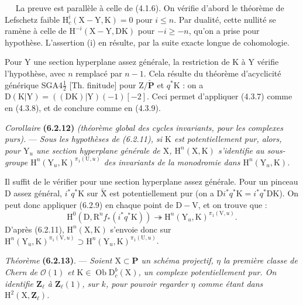 \documentclass[11pt,leqno]{article}
\newcommand{\Page}[1]{\ifvmode\noindent\else\unskip\ \fi{\footnotesize\textcolor{gray}{[p.\,#1]}}\ \ignorespaces}
\begin{document}
\Page{250}
La preuve est parallèle à celle de (4.1.6). On vérifie d’abord le théorème de Lefschetz faible \(\mathrm{H}_c^i(\mathrm{X}-\mathrm{Y},\mathrm{K})=0\) pour \(i\leq n\). Par dualité, cette nullité se ramène à celle de \(\mathrm{H}^{-i}(\mathrm{X}-\mathrm{Y},\mathrm{DK})\) pour \(-i\geq -n\), qu’on a prise pour hypothèse. L’assertion (i) en résulte, par la suite exacte longue de cohomologie.

Pour \(\mathrm{Y}\) une section hyperplane assez générale, la restriction de \(\mathrm{K}\) à \(\mathrm{Y}\) vérifie l’hypothèse, avec \(n\) remplacé par \(n-1\). Cela résulte du théorème d’acyclicité générique SGA4\(\frac{1}{2}\) [Th. finitude] pour \(\mathrm{Z}/\check{\mathbf{P}}\) et \(q^*\mathrm{K}\) : on a \(\mathrm{D}(\mathrm{K}|\mathrm{Y})=((\mathrm{DK})|\mathrm{Y})(-1)[-2]\). Ceci permet d’appliquer (4.3.7) comme en (4.3.8), et de conclure comme en (4.3.9).

\medskip
\textit{Corollaire} \textbf{(6.2.12)} \textit{(théorème global des cycles invariants, pour les complexes purs).} — \textit{Sous les hypothèses de \textup{(6.2.11)}, si \(\mathrm{K}\) est potentiellement pur, alors, pour \(\mathrm{Y}_u\) une section hyperplane générale de \(\mathrm{X}\), \(\mathrm{H}^n(\mathrm{X},\mathrm{K})\) s’identifie au sous-groupe \(\mathrm{H}^n(\mathrm{Y}_u,\mathrm{K})^{\pi_1(\mathrm{U},u)}\) des invariants de la monodromie dans \(\mathrm{H}^n(\mathrm{Y}_u,\mathrm{K})\).}

\medskip
Il suffit de le vérifier pour une section hyperplane assez générale. Pour un pinceau \(\mathrm{D}\) assez général, \(i^*q^*\mathrm{K}\) sur \(\widetilde{\mathrm{X}}\) est potentiellement pur (on a \(\mathrm{D}i^*q^*\mathrm{K}=i^*q^*\mathrm{DK}\)). On peut donc appliquer (6.2.9) en chaque point de \(\mathrm{D}-\mathrm{V}\), et on trouve que :
\[
\mathrm{H}^0(\mathrm{D},\mathrm{R}^nf_*(i^*q^*\mathrm{K}))
\twoheadrightarrow
\mathrm{H}^n(\mathrm{Y}_u,\mathrm{K})^{\pi_1(\mathrm{V},u)}.
\]
D’après (6.2.11), \(\mathrm{H}^n(\mathrm{X},\mathrm{K})\) s’envoie donc sur \(\mathrm{H}^n(\mathrm{Y}_u,\mathrm{K})^{\pi_1(\mathrm{V},u)}
\supset
\mathrm{H}^n(\mathrm{Y}_u,\mathrm{K})^{\pi_1(\mathrm{U},u)}\).

\medskip
\textit{Théorème} \textbf{(6.2.13)}. — \textit{Soient \(\mathrm{X}\subset\mathbf{P}\) un schéma projectif, \(\eta\) la première classe de Chern de \(\mathcal{O}(1)\) et \(\mathrm{K}\in\operatorname{Ob}\mathrm{D}_c^b(\mathrm{X})\), un complexe potentiellement pur. On identifie \(\mathbf{Z}_{\ell}\) à \(\mathbf{Z}_{\ell}(1)\), sur \(k\), pour pouvoir regarder \(\eta\) comme étant dans \(\mathrm{H}^2(\mathrm{X},\mathbf{Z}_{\ell})\).}
\end{document}
